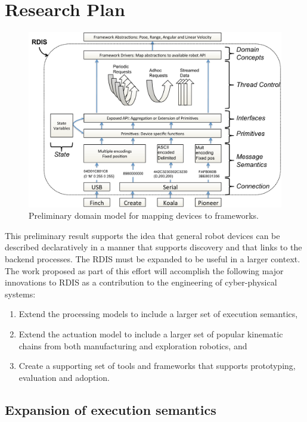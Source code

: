 
\section{Research Plan}
\label{sec:research-plan}

\begin{figure}[thpb]
      \centering
      \includegraphics[width=5in]{dm.pdf}
      \caption{Preliminary domain model for mapping devices to frameworks.}
      \label{dm}
\end{figure}

This preliminary result supports the idea that general robot devices can be described declaratively in a manner that supports discovery and that links to the backend processes.  The RDIS must be expanded to be useful in a larger context.  The work proposed as part of this effort will accomplish the following major innovations to RDIS as a contribution to the engineering of cyber-physical systems: 
\begin{enumerate}
\item Extend the processing models to include a larger set of execution semantics, 
\item Extend the actuation model to include a larger set of popular kinematic chains from both manufacturing and exploration robotics, and
\item Create a supporting set of tools and frameworks that supports prototyping, evaluation and adoption.   
\end{enumerate}

\subsection{Expansion of execution semantics}

